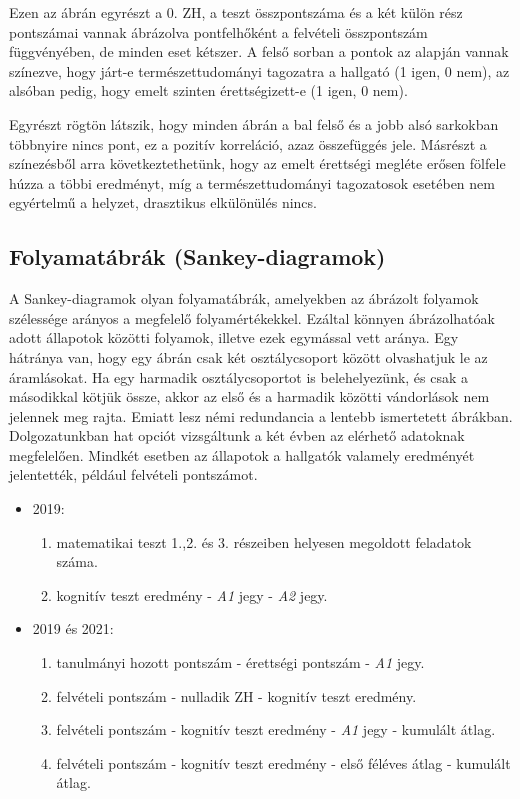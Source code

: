 \documentclass[12pt]{article}
\begin{document}
Ezen az ábrán egyrészt a 0. ZH, a teszt összpontszáma és a két külön rész pontszámai vannak ábrázolva pontfelhőként a felvételi összpontszám függvényében, de minden eset kétszer. A felső sorban a pontok az alapján vannak színezve, hogy járt-e természettudományi tagozatra a hallgató (1 igen, 0 nem), az alsóban pedig, hogy emelt szinten érettségizett-e (1 igen, 0 nem).

Egyrészt rögtön látszik, hogy minden ábrán a bal felső és a jobb alsó sarkokban többnyire nincs pont, ez a pozitív korreláció, azaz összefüggés jele. Másrészt a színezésből arra következtethetünk, hogy az emelt érettségi megléte erősen fölfele húzza a többi eredményt, míg a természettudományi tagozatosok esetében nem egyértelmű a helyzet, drasztikus elkülönülés nincs.






\subsection{Folyamatábrák (Sankey-diagramok)}
A Sankey-diagramok olyan folyamatábrák, amelyekben az ábrázolt folyamok szélessége arányos a megfelelő folyamértékekkel. Ezáltal könnyen ábrázolhatóak adott állapotok közötti folyamok, illetve ezek egymással vett aránya. Egy hátránya van, hogy egy ábrán csak két osztálycsoport között olvashatjuk le az áramlásokat. Ha egy harmadik osztálycsoportot is belehelyezünk, és csak a másodikkal kötjük össze, akkor az első és a harmadik közötti vándorlások nem jelennek meg rajta. Emiatt lesz némi redundancia a lentebb ismertetett ábrákban.\\
Dolgozatunkban hat opciót vizsgáltunk a két évben az elérhető adatoknak megfelelően. Mindkét esetben az állapotok a hallgatók valamely eredményét jelentették, például felvételi pontszámot.
\begin{itemize}

\item 2019:

\begin{enumerate}
\item matematikai teszt 1.,2. és 3. részeiben helyesen megoldott feladatok száma.
\item kognitív teszt eredmény - \textit{A1} jegy - \textit{A2} jegy.
\end{enumerate}

\item 2019 és 2021:

\begin{enumerate}
\item tanulmányi hozott pontszám - érettségi pontszám - \textit{A1} jegy.
\item felvételi pontszám - nulladik ZH - kognitív teszt eredmény.
\item felvételi pontszám - kognitív teszt eredmény - \textit{A1} jegy - kumulált átlag.
\item felvételi pontszám - kognitív teszt eredmény - első féléves átlag - kumulált átlag.
\end{enumerate}

\end{itemize}
\end{document}

